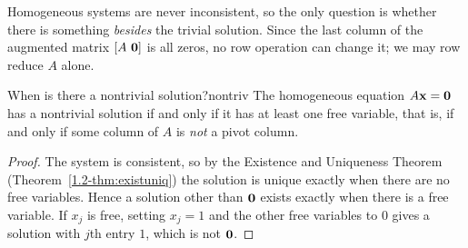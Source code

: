 \documentclass[11pt]{article}
\begin{document}
Homogeneous systems are never inconsistent, so the only question is whether there is something \emph{besides} the trivial solution. Since the last column of the augmented matrix
$[A\ \bv{0}]$ is all zeros, no row operation can change it; we may row reduce $A$ alone.

\begin{thm}{When is there a nontrivial solution?}{nontriv}
The homogeneous equation $A\mathbf{x}=\mathbf{0}$ has a nontrivial solution if and only if it has at least one free variable, that is, if and only if some column of $A$ is \emph{not} a pivot column.
\end{thm}

\begin{proof}
The system is consistent, so by the Existence and Uniqueness Theorem (Theorem~\ref{1.2-thm:existuniq}) the solution is unique exactly when there are no free variables. Hence
a solution other than $\mathbf{0}$ exists exactly when there is a free variable. If $x_j$ is free, setting $x_j=1$ and the other free variables to $0$ gives a solution with $j$th entry $1$, which is not $\mathbf{0}$.
\end{proof}
\end{document}
